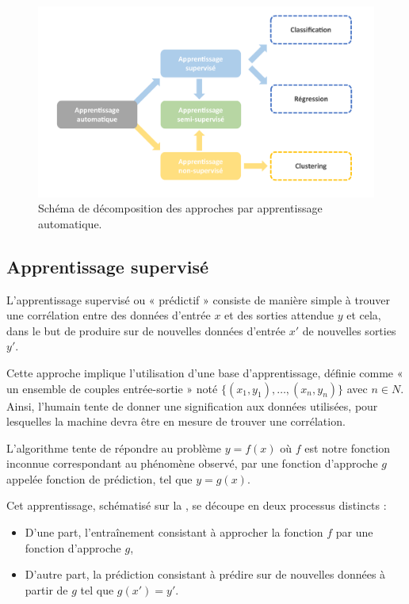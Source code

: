  \begin{figure}[H]
    \centering 
    \includegraphics[width=\linewidth]{contents/chapter_3/resources/scheme_machine_learning.pdf}
    \caption{Schéma de décomposition des approches par apprentissage automatique.}
    \label{fig:scheme_machine_learning}
\end{figure}

\subsection{Apprentissage supervisé}
L’apprentissage supervisé ou « prédictif » consiste de manière simple à trouver une corrélation entre des données d’entrée $x$ et des sorties attendue $y$ et cela, dans le but de produire sur de nouvelles données d’entrée $x'$ de nouvelles sorties $y'$.\par

Cette approche implique l’utilisation d’une base d’apprentissage, définie comme « un ensemble de couples entrée-sortie » noté $\{(x_1,y_1 ),\ldots,(x_n,y_n )\}$ avec $n \in N$. Ainsi, l’humain tente de donner une signification aux données utilisées, pour lesquelles la machine devra être en mesure de trouver une corrélation.\par

L’algorithme tente de répondre au problème $y=f(x)$ où $f$ est notre fonction inconnue correspondant au phénomène observé, par une fonction d’approche $g$ appelée fonction de prédiction, tel que $y=g(x)$.\par 

Cet apprentissage, schématisé sur la , se découpe en deux processus distincts :
\begin{itemize}
    \item D’une part, l’entraînement consistant à approcher la fonction $f$ par une fonction d’approche $g$,
    \item D’autre part, la prédiction consistant à prédire sur de nouvelles données à partir de $g$ tel que $g(x') = y'$.
\end{itemize}\par
  
